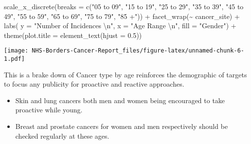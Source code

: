 \documentclass[
]{article}
\newenvironment{Shaded}{\begin{snugshade}}{\end{snugshade}}
\newcommand{\AttributeTok}[1]{\textcolor[rgb]{0.77,0.63,0.00}{#1}}
\newcommand{\FloatTok}[1]{\textcolor[rgb]{0.00,0.00,0.81}{#1}}
\newcommand{\FunctionTok}[1]{\textcolor[rgb]{0.00,0.00,0.00}{#1}}
\newcommand{\NormalTok}[1]{#1}
\newcommand{\SpecialCharTok}[1]{\textcolor[rgb]{0.00,0.00,0.00}{#1}}
\newcommand{\StringTok}[1]{\textcolor[rgb]{0.31,0.60,0.02}{#1}}
\begin{document}
\begin{Shaded}
\begin{Highlighting}[]
  \FunctionTok{scale\_x\_discrete}\NormalTok{(}\AttributeTok{breaks =} \FunctionTok{c}\NormalTok{(}\StringTok{"05 to 09"}\NormalTok{, }\StringTok{"15 to 19"}\NormalTok{, }\StringTok{"25 to 29"}\NormalTok{, }
                              \StringTok{"35 to 39"}\NormalTok{, }\StringTok{"45 to 49"}\NormalTok{, }\StringTok{"55 to 59"}\NormalTok{, }
                              \StringTok{"65 to 69"}\NormalTok{, }\StringTok{"75 to 79"}\NormalTok{, }\StringTok{"85 +"}\NormalTok{)) }\SpecialCharTok{+}
  \FunctionTok{facet\_wrap}\NormalTok{(}\SpecialCharTok{\textasciitilde{}}\NormalTok{ cancer\_site) }\SpecialCharTok{+}
  \FunctionTok{labs}\NormalTok{(}
       \AttributeTok{y =} \StringTok{"Number of Incidences }\SpecialCharTok{\textbackslash{}n}\StringTok{"}\NormalTok{,}
       \AttributeTok{x =} \StringTok{"Age Range }\SpecialCharTok{\textbackslash{}n}\StringTok{"}\NormalTok{,}
       \AttributeTok{fill =} \StringTok{"Gender"}\NormalTok{) }\SpecialCharTok{+}
  \FunctionTok{theme}\NormalTok{(}\AttributeTok{plot.title =} \FunctionTok{element\_text}\NormalTok{(}\AttributeTok{hjust =} \FloatTok{0.5}\NormalTok{))}
\end{Highlighting}
\end{Shaded}

\texttt{[image: NHS-Borders-Cancer-Report\_files/figure-latex/unnamed-chunk-6-1.pdf]}

This is a brake down of Cancer type by age reinforces the demographic of
targets to focus any publicity for proactive and reactive approaches.

\begin{itemize}
\item
  Skin and lung cancers both men and women being encouraged to take
  proactive while young.
\item
  Breast and prostate cancers for women and men respectively should be
  checked regularly at these ages.
\end{itemize}
\end{document}
